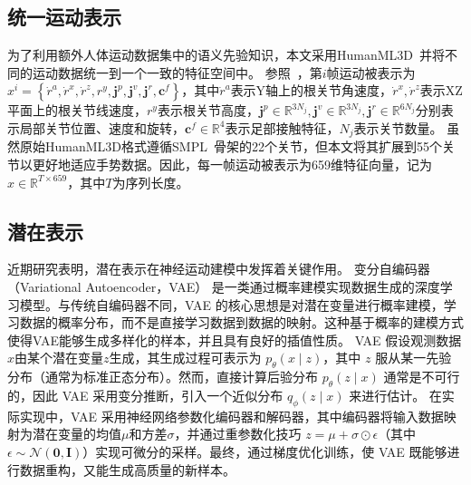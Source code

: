 \subsection{统一运动表示}
\label{sec:method:m_rep:unified}
为了利用额外人体运动数据集中的语义先验知识，本文采用HumanML3D~\cite{guo2022humanml3d}并将不同的运动数据统一到一个一致的特征空间中。
参照~\cite{yang2024freetalker,guo2022humanml3d}，第$i$帧运动被表示为$x^i=\left\{\dot{r}^a, \dot{r}^x, \dot{r}^z, r^y, \mathbf{j}^p, \mathbf{j}^v, \mathbf{j}^r, \mathbf{c}^f\right\}$，其中$\dot{r}^a$表示Y轴上的根关节角速度，$\dot{r}^x, \dot{r}^z$表示XZ平面上的根关节线速度，$r^y$表示根关节高度，$\mathbf{j}^p \in \mathbb{R}^{3N_j}, \mathbf{j}^v \in \mathbb{R}^{3N_j}, \mathbf{j}^r \in \mathbb{R}^{6N_j}$分别表示局部关节位置、速度和旋转，$\mathbf{c}^f \in \mathbb{R}^4$表示足部接触特征，$N_j$表示关节数量。
虽然原始HumanML3D格式遵循SMPL~\cite{loper2023smpl}骨架的22个关节，但本文将其扩展到55个关节以更好地适应手势数据。因此，每一帧运动被表示为659维特征向量，记为$x \in \mathbb{R}^{T\times 659}$，其中$T$为序列长度。


\subsection{潜在表示}
近期研究表明，潜在表示在神经运动建模中发挥着关键作用。
变分自编码器（Variational Autoencoder，VAE）\cite{kingma2013vae} 是一类通过概率建模实现数据生成的深度学习模型。与传统自编码器不同，VAE 的核心思想是对潜在变量进行概率建模，学习数据的概率分布，而不是直接学习数据到数据的映射。这种基于概率的建模方式使得VAE能够生成多样化的样本，并且具有良好的插值性质。
VAE 假设观测数据$x$由某个潜在变量$z$生成，其生成过程可表示为 $p_{\theta}(x \mid z)$，其中 $z$ 服从某一先验分布（通常为标准正态分布）。然而，直接计算后验分布 $p_{\theta}(z \mid x)$ 通常是不可行的，因此 VAE 采用变分推断，引入一个近似分布 $q_{\phi}(z \mid x)$ 来进行估计。
在实际实现中，VAE 采用神经网络参数化编码器和解码器，其中编码器将输入数据映射为潜在变量的均值$\mu$和方差$\sigma$，并通过重参数化技巧 $z = \mu + \sigma \odot \epsilon$（其中 $\epsilon \sim \mathcal{N}(\mathbf{0}, \mathbf{I})$）实现可微分的采样。最终，通过梯度优化训练，使 VAE 既能够进行数据重构，又能生成高质量的新样本。

